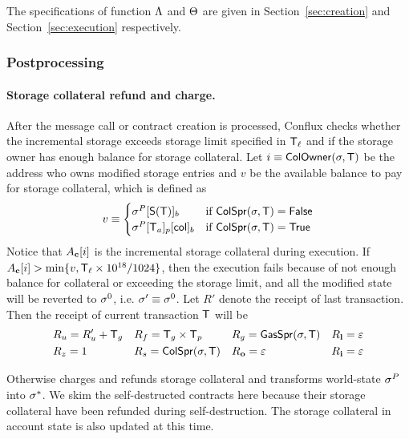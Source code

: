 The specifications of function $\mathrm{\Lambda}$ and $\mathrm{\Theta}$ are given in Section~\ref{sec:creation} and Section~\ref{sec:execution} respectively.

\subsubsection{Postprocessing}\label{sec:tx_post_process}

\paragraph{Storage collateral refund and charge.}

After the message call or contract creation is processed, Conflux checks whether the incremental storage exceeds storage limit specified in $\textsf{T}_\ell$ and if the storage owner has enough balance for storage collateral. 
Let $i\equiv \mathsf{ColOwner}(\mathbf{\sigma},\textsf{T})$ be the address who owns modified storage entries and $v$ be the available balance to pay for storage collateral, which is defined as 
\begin{align}
	v \equiv \begin{cases}
		\mathbf{\sigma}^{P}[\mathsf{S}{\left({\textsf{T}} \right)}]_b & \text{if }\mathsf{ColSpr}(\mathbf{\sigma},\textsf{T})=\mathsf{False} \\
		\mathbf{\sigma}^{P}[\textsf{T}_a]_p[{\sf col}]_b &  \text{if }\mathsf{ColSpr}(\mathbf{\sigma},\textsf{T})=\mathsf{True}
	\end{cases}
\end{align}
%
Notice that $A_{\bf c}[i]$ is the incremental storage collateral during execution.
If $A_{\bf c}[i]>\min\{v,\textsf{T}_\ell\times 10^{18}/1024\}$, then the execution fails because of not enough balance for collateral or exceeding the storage limit, 
and all the modified state will be reverted to $\mathbf{\sigma}^0$, 
i.e. $\mathbf{\sigma}'\equiv\mathbf{\sigma}^0$. 
Let $R'$ denote the receipt of last transaction.
Then the receipt of current transaction $\textsf{T}$ will be 
\begin{align}
	&R_u=R'_u+\textsf{T}_g && R_f = \textsf{T}_g\times\textsf{T}_p && R_g = \mathsf{GasSpr}(\mathbf{\sigma},\textsf{T}) && R_{\bf l}=\mathbb{\varepsilon} \\
	&R_z=1 && R_s = \mathsf{ColSpr}(\mathbf{\sigma},\textsf{T}) && R_{\bf o}=\mathbb{\varepsilon} && R_{\bf i}=\mathbb{\varepsilon}
\end{align}

Otherwise \name charges and refunds storage collateral and transforms world-state $\mathbf{\sigma}^P$ into $\mathbf{\sigma}^*$. 
We skim the self-destructed contracts here because their storage collateral have been refunded during self-destruction. 
The storage collateral in account state is also updated at this time. 


